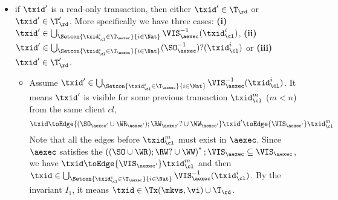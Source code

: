 \begin{itemize}
\begin{itemize}
\begin{itemize}
\begin{equation}
        \label{equ:cp-dagger}
        \dagger  \equiv 
            \fora{\ke, \ke', i, j}
                i \in \vi(\ke)  \wedge \WTx(\mkvs(\ke', j)) \toEdge{(((\PO \cup \RF_{\mkvs}) ; \AD_{\mkvs}?) \cup \VO_{\mkvs})^{+}} \WTx(\mkvs(\ke, i))
            \implies j \in \vi(\ke')  
        \end{equation}
        Since \( \WR_\mkvs \), \( \WW_\mkvs \) and \( \RW_\mkvs \) coincide with
        \( \WR_\aexec \), \( \WW_\aexec \) and \( \RW_\aexec \) respectively.
        Also because \( \txid \) write to at least one key,
        it is easy to see there exists some version \( \ke'',m\) such that 
        \( \txid = \WTx(\mkvs(\ke'',m))\) and \( m \in \vi(\ke'')\).
        By definition of \( \Tx \), it follows \( \txid \in \Tx(\mkvs, \vi) \).
        \item if \( \txid \) is a read-only transaction, we add it into \( \T'_\rd \).
    \end{itemize}
    \item 
    if \( \txid' \) is a read-only transaction, then either \( \txid' \in \T_\rd \) or \( \txid' \in \T'_\rd \).
    More specifically we have three cases: \textbf{(i)} \( \txid' \in \bigcup_{\Setcon{\txid_{\cl}^{i} \in \T_{\aexec} }{ i \in \Nat }} \VIS_{\aexec}^{-1}(\txid^i_\cl) \), \textbf{(ii)} \( \txid' \in \bigcup_{\Setcon{\txid_{\cl}^{i} \in \T_{\aexec} }{ i \in \Nat }} (\SO_{\aexec}^{-1})?(\txid^i_\cl) \) or \textbf{(iii)} \( \txid' \in \T'_\rd\).
    \begin{itemize}
        \item
            Assume \( \txid' \in \bigcup_{\Setcon{\txid_{\cl}^{i} \in \T_{\aexec} }{ i \in \Nat }} \VIS_{\aexec}^{-1}(\txid^i_\cl) \).
        It means \( \txid' \) is visible for some previous transaction \( \txid_\cl^m \) (\( m < n \)) from the same client \( cl \), 
        \ie 
        \[ 
            \txid \toEdge{(\SO_{\aexec'} \cup \WR_{\aexec'} ) ; \RW_{\aexec'}? \cup \WW_{\aexec'}} \txid' \toEdge{\VIS_{\aexec'}}  \txid_\cl^m 
        \]
        Note that all the edges before \( \txid_\cl^m \) must exist in \( \aexec \).
        Since \( \aexec \) satisfies the \( \left( (\SO \cup \WR ) ; \RW? \cup \WW \right)^* ; \VIS_\aexec \subseteq \VIS_\aexec \),
        we have \( \txid \toEdge{\VIS_{\aexec'}} \txid_\cl^m \) and then \( \txid \in \bigcup_{\Setcon{\txid_{\cl}^{i} \in \T_{\aexec} }{ i \in \Nat }} \VIS_{\aexec}^{-1}(\txid^i_\cl)\).
        By the invariant \( I_1 \), it means \( \txid \in \Tx(\mkvs, \vi) \cup \T_\rd \).

\end{itemize}
\end{itemize}
\end{itemize}

